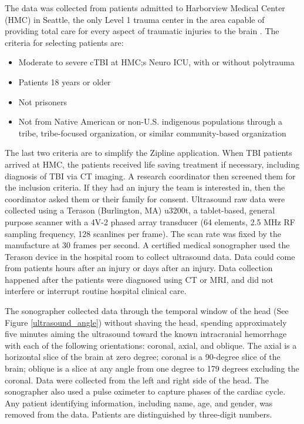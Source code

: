 \documentclass [11pt, proquest] {uwthesis}[2020/02/24]
\begin{document}
The data was collected from patients admitted to Harborview Medical Center (HMC) in Seattle, the only Level 1 trauma 
center in the area capable of providing total care for every aspect of traumatic injuries to the brain \cite{trauma_care}.
The criteria for selecting patients are:
\begin{itemize}
  \item Moderate to severe cTBI at HMC;s Neuro ICU, with or without polytrauma
  \item Patients 18 years or older
  \item Not prisoners
  \item Not from Native American or non-U.S. indigenous populations through a tribe, tribe-focused organization, or similar community-based organization
\end{itemize}
The last two criteria are to simplify the Zipline application.
When TBI patients arrived at HMC, the patients received life saving treatment if necessary, including diagnosis of TBI via CT imaging.
A research coordinator then screened them for the inclusion criteria. If they had an injury the team is interested in, then 
the coordinator asked them or their family for consent. Ultrasound raw data were collected using a Terason (Burlington, MA) u3200t, a tablet-based, 
general purpose scanner with a 4V-2 phased array transducer (64 elements, 2.5 MHz RF sampling frequency, 128 scanlines
per frame). The scan rate was fixed by the manufacture at 30 frames per second. A certified medical sonographer used the Terason 
device in the hospital room to collect ultrasound data. Data could come from patients hours after an injury or days after 
an injury. Data collection happened after the patients were diagnosed using CT or MRI, and did not interfere or interrupt 
routine hospital clinical care.

The sonographer collected data through the temporal window of the head (See Figure \ref{ultrasound_angle}) without
shaving the head, spending approximately five minutes aiming the ultrasound toward the known intracranial hemorrhage with 
each of the following orientations: coronal, axial, and oblique. The axial is a horizontal slice of the brain at zero degree; 
coronal is a 90-degree slice of the brain; oblique is a slice at any angle from one degree to 179 degrees excluding the coronal. 
Data were collected from the left and right side of the head. The sonographer also used a pulse oximeter to capture
phases of the cardiac cycle. Any patient identifying information, including name, age, and gender, was removed from the data. 
Patients are distinguished by three-digit numbers.
\end{document}
